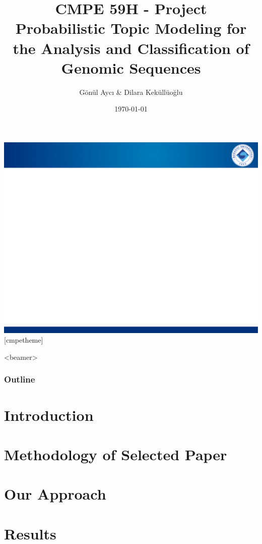 \documentclass{beamer}
\title[]{CMPE 59H - Project \\\tiny Probabilistic Topic Modeling for the Analysis and Classification of Genomic Sequences
} %
\author{G\"{o}n\"{u}l Aycı \& Dilara Keküllüoğlu}
\institute[]{
	\inst{} Computer Engineering, Boğaziçi University\\ \textbf{Instructor}: Assoc. Dr. Arzucan ÖZGÜR}
\date{\today}
\begin{document}
	
{\includegraphics[width=\paperwidth,height=\paperheight]{figures/slide_bg.pdf}}
[cmpetheme]

\begin{frame}[plain]
	\titlepage
\end{frame}
\begin{frame}<beamer>
	\frametitle{Outline}
	\tableofcontents
\end{frame}

\section{Introduction}

\section{Methodology of Selected Paper}

\section{Our Approach}

\section{Results}
\end{document}
